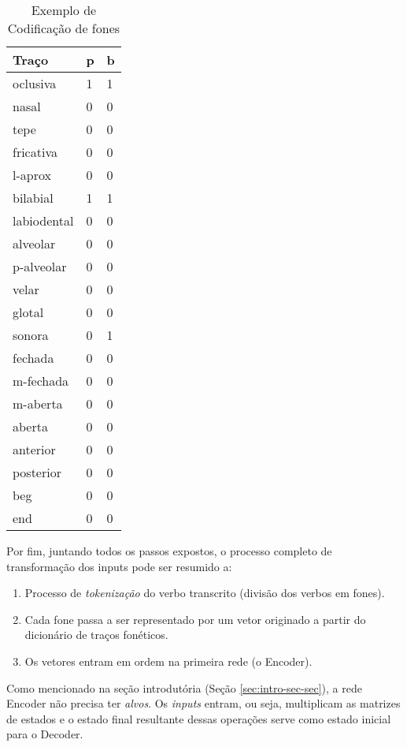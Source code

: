 \begin{table}[H]
\begin{center}
\begin{tabular}{lll}
 Traço & p & b \\
 \toprule
oclusiva & 1 & 1 \\
nasal & 0 & 0 \\
tepe & 0 & 0 \\
fricativa & 0 & 0 \\
l-aprox & 0 & 0 \\
bilabial & 1 & 1 \\
labiodental & 0 & 0 \\
alveolar & 0 & 0 \\
p-alveolar & 0 & 0 \\
velar & 0 & 0 \\
glotal & 0 & 0 \\
sonora & 0 & 1 \\
fechada & 0 & 0 \\
m-fechada & 0 & 0 \\
m-aberta & 0 & 0 \\
aberta & 0 & 0 \\
anterior & 0 & 0 \\
posterior & 0 & 0 \\
\<beg\> & 0 & 0 \\
\<end\> & 0 & 0
\end{tabular}
\end{center}
\caption{Exemplo de Codificação de fones}
\label{tab:coding_example}
\end{table}

Por fim, juntando todos os passos expostos, o processo completo de transformação dos inputs pode ser resumido a:

\begin{enumerate}
    \item Processo de \textit{tokenização} do verbo transcrito (divisão dos verbos em fones).
    \item Cada fone passa a ser representado por um vetor originado a partir do dicionário de traços fonéticos.
    \item Os vetores entram em ordem na primeira rede (o Encoder).
\end{enumerate}

Como mencionado na seção introdutória (Seção \ref{sec:intro-sec-sec}), a rede Encoder não precisa ter \textit{alvos}. Os \textit{inputs} entram, ou seja, multiplicam as matrizes de estados e o estado final resultante dessas operações serve como estado inicial para o Decoder. 

